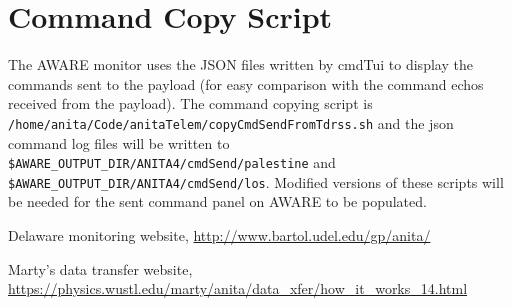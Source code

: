 \documentclass{article}
\begin{document}
\section{Command Copy Script}
The AWARE monitor uses the JSON files written by cmdTui to display the commands sent to the payload (for easy comparison with the command echos received from the payload). The command copying script is \\{\tt /home/anita/Code/anitaTelem/copyCmdSendFromTdrss.sh} and the json command log files will be written to {\tt \$AWARE\_OUTPUT\_DIR/ANITA4/cmdSend/palestine} and {\tt \$AWARE\_OUTPUT\_DIR/ANITA4/cmdSend/los}. Modified versions of these scripts will be needed for the sent command panel on AWARE to be populated.



\begin{thebibliography}{99}
        
 Delaware monitoring website, \url{http://www.bartol.udel.edu/gp/anita/}

  Marty's data transfer website, \url{https://physics.wustl.edu/marty/anita/data_xfer/how_it_works_14.html}

\end{thebibliography}
\end{document}
